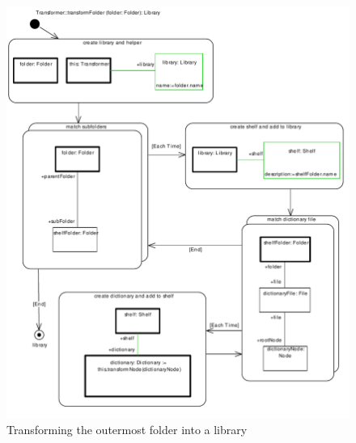 \begin{enumerate}
\begin{figure}[!htbp]
\begin{center}
 \includegraphics[width=\textwidth]{pics/moca/3MocaTreeToModel/transformFolderPrintPdf}
  \caption{Transforming the outermost folder into a library}
  \label{fig:moca-transformFolder}
\end{center}
\end{figure}


\end{enumerate}
